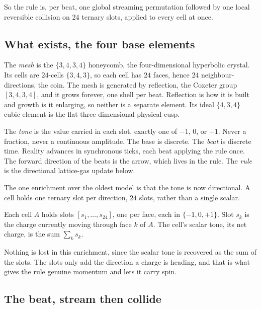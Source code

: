So the rule is, per beat, one global streaming permutation followed by one local reversible collision on $24$
ternary slots, applied to every cell at once.

\subsection{What exists, the four base elements}

The \emph{mesh} is the $\{3,4,3,4\}$ honeycomb, the four-dimensional hyperbolic crystal. Its cells are
$24$-cells $\{3,4,3\}$, so each cell has $24$ faces, hence $24$ neighbour-directions, the coin. The mesh is
generated by reflection, the Coxeter group $[3,4,3,4]$, and it grows forever, one shell per beat. Reflection is
how it is built and growth is it enlarging, so neither is a separate element. Its ideal $\{4,3,4\}$ cubic element
is the flat three-dimensional physical cusp.

The \emph{tone} is the value carried in each slot, exactly one of $-1$, $0$, or $+1$. Never a fraction, never a
continuous amplitude. The base is discrete. The \emph{beat} is discrete time. Reality advances in synchronous
ticks, each beat applying the rule once. The forward direction of the beats is the arrow, which lives in the
rule. The \emph{rule} is the directional lattice-gas update below.

The one enrichment over the oldest model is that the tone is now directional. A cell holds one ternary slot per
direction, $24$ slots, rather than a single scalar.

\begin{definition}
Each cell $A$ holds slots $[s_1, \ldots, s_{24}]$, one per face, each in $\{-1, 0, +1\}$. Slot $s_k$ is the
charge currently moving through face $k$ of $A$. The cell's scalar tone, its net charge, is the sum
$\sum_{k} s_k$.
\end{definition}

Nothing is lost in this enrichment, since the scalar tone is recovered as the sum of the slots. The slots only add
the direction a charge is heading, and that is what gives the rule genuine momentum and lets it carry spin.

\subsection{The beat, stream then collide}

